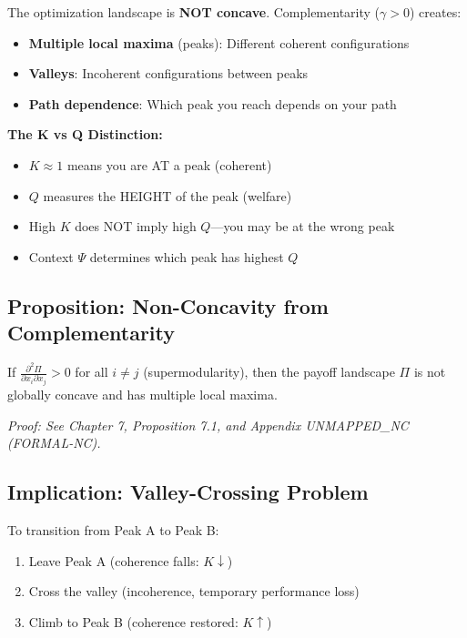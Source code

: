 \begin{tcolorbox}[colback=orange!5!white, colframe=orange!75!black,
    title=\textbf{Critical: Non-Concavity and Multiple Equilibria}]

The optimization landscape is \textbf{NOT concave}. Complementarity ($\gamma > 0$) creates:

\begin{itemize}
\item \textbf{Multiple local maxima} (peaks): Different coherent configurations
\item \textbf{Valleys}: Incoherent configurations between peaks
\item \textbf{Path dependence}: Which peak you reach depends on your path
\end{itemize}

\textbf{The K vs Q Distinction:}
\begin{itemize}
\item $K \approx 1$ means you are AT a peak (coherent)
\item $Q$ measures the HEIGHT of the peak (welfare)
\item High $K$ does NOT imply high $Q$---you may be at the wrong peak
\item Context $\Psi$ determines which peak has highest $Q$
\end{itemize}

\end{tcolorbox}

\subsection{Proposition: Non-Concavity from Complementarity}

\begin{proposition}
If $\frac{\partial^2 \Pi}{\partial x_i \partial x_j} > 0$ for all $i \neq j$ (supermodularity),
then the payoff landscape $\Pi$ is not globally concave and has multiple local maxima.
\end{proposition}

\textit{Proof: See Chapter 7, Proposition 7.1, and Appendix UNMAPPED_NC (FORMAL-NC).}

\subsection{Implication: Valley-Crossing Problem}

To transition from Peak A to Peak B:
\begin{enumerate}
\item Leave Peak A (coherence falls: $K \downarrow$)
\item Cross the valley (incoherence, temporary performance loss)
\item Climb to Peak B (coherence restored: $K \uparrow$)
\end{enumerate}


